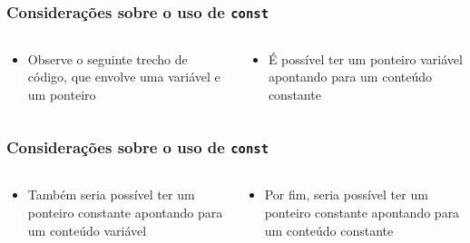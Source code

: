 \documentclass[aspectratio=169]{beamer}
\begin{document}
\begin{frame}[fragile]\frametitle{Considerações sobre o uso de \texttt{const}}
\begin{columns}
\begin{column}{0.5\linewidth}
\begin{itemize}
	\item Observe o seguinte trecho de código, que envolve uma variável e um ponteiro

\end{itemize}
\end{column}
\begin{column}{0.5\linewidth}
\begin{itemize}
	\item É possível ter um ponteiro variável apontando para um conteúdo constante

\end{itemize}
\end{column}
\end{columns}
\end{frame}

\begin{frame}[fragile]\frametitle{Considerações sobre o uso de \texttt{const}}
\begin{columns}
\begin{column}{0.5\linewidth}
\begin{itemize}
	\item Também seria possível ter um ponteiro constante apontando para um conteúdo variável

\end{itemize}
\end{column}
\begin{column}{0.5\linewidth}
\begin{itemize}
	\item Por fim, seria possível ter um ponteiro constante apontando para um conteúdo constante

\end{itemize}
\end{column}
\end{columns}
\end{frame}

\end{document}
